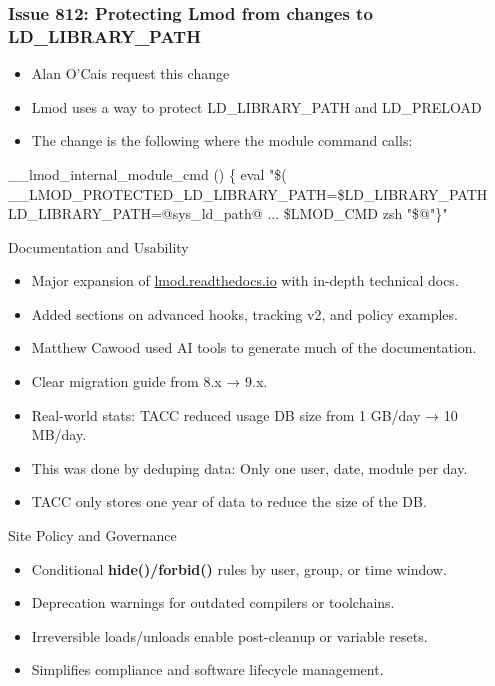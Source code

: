 \documentclass[aspectratio=169]{beamer}
\begin{document}
\begin{frame}[fragile]
    \frametitle{Issue 812: Protecting Lmod from changes to LD\_LIBRARY\_PATH}
  \begin{itemize}
    \item Alan O'Cais request this change
    \item Lmod uses a way to protect LD\_LIBRARY\_PATH and LD\_PRELOAD
    \item The change is the following where the module command calls:
  \end{itemize}
 {\small
    \begin{semiverbatim}
\_\_lmod\_internal\_module\_cmd () \{
        eval "\$( \_\_LMOD\_PROTECTED\_LD\_LIBRARY\_PATH=\$LD\_LIBRARY\_PATH 
           LD\_LIBRARY\_PATH=@sys\_ld\_path@
           ...
           \$LMOD\_CMD zsh "\$@"\}"

    \end{semiverbatim}
}
\end{frame}


\begin{frame}{Documentation and Usability}
  \begin{itemize}
    \item Major expansion of \href{https://lmod.readthedocs.io}{lmod.readthedocs.io} with in-depth technical docs.
    \item Added sections on advanced hooks, tracking v2, and policy
      examples.
    \item Matthew Cawood used AI tools to generate much of the documentation.
    \item Clear migration guide from 8.x → 9.x.
    \item Real-world stats: TACC reduced usage DB size from 1 GB/day →
      10 MB/day.
    \item This was done by deduping data: Only one user, date, module
      per day.
    \item TACC only stores one year of data to reduce the size of the DB.
  \end{itemize}
\end{frame}

\begin{frame}{Site Policy and Governance}
  \begin{itemize}
    \item Conditional \textbf{hide()/forbid()} rules by user, group, or time window.
    \item Deprecation warnings for outdated compilers or toolchains.
    \item Irreversible loads/unloads enable post-cleanup or variable resets.
    \item Simplifies compliance and software lifecycle management.
  \end{itemize}
\end{frame}
\end{document}
